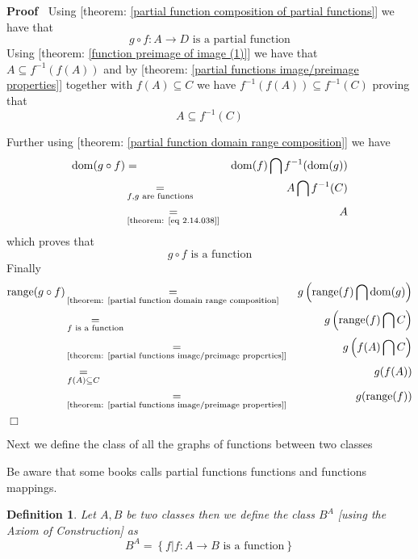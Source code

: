 \documentclass{book}
\newcommand{\equallim}{\mathop{=}\limits}
\newcommand{\tmop}[1]{\ensuremath{\operatorname{#1}}}
\newenvironment{proof}{\noindent\textbf{Proof\ }}{\hspace*{\fill}$\Box$\medskip}
\newtheorem{definition}{Definition}
{\theorembodyfont{\rmfamily}\newtheorem{example}{Example}}
\begin{document}
\begin{proof}
  Using [theorem: \ref{partial function composition of partial functions}] we
  have that
  \[ g \circ f : A \rightarrow D \text{ is a partial function} \]
  Using [theorem: \ref{function preimage of image (1)}] we have that $A
  \subseteq f^{- 1} (f (A))$ and by [theorem: \ref{partial functions
  image/preimage properties}] together with $f (A) \subseteq C$ we have $f^{-
  1} (f (A)) \subseteq f^{- 1} (C)$ proving that
  \begin{equation}
    \label{eq 2.14.038} A \subseteq f^{- 1} (C)
  \end{equation}
  
  
  Further using [theorem: \ref{partial function domain range composition}] we
  have
  \begin{eqnarray*}
    \tmop{dom} (g \circ f) & = & \tmop{dom} (f) \bigcap f^{- 1} (\tmop{dom}
    (g))\\
    & \equallim_{f, g \text{ are functions}} & A \bigcap f^{- 1} (C)\\
    & \equallim_{\text{[theorem: \ref{eq 2.14.038}]}} & A
  \end{eqnarray*}
  which proves that
  \[ g \circ f \text{ is a function} \]
  Finally
  \begin{eqnarray*}
    \tmop{range} (g \circ f) & \equallim_{\text{[theorem: \ref{partial
    function domain range composition}}} & g \left( \tmop{range} (f) \bigcap
    \tmop{dom} (g) \right)\\
    & \equallim_{f \text{ is a function}} & g \left( \tmop{range} (f) \bigcap
    C \right)\\
    & \equallim_{\text{[theorem: \ref{partial functions image/preimage
    properties}]}} & g \left( f (A) \bigcap C \right)\\
    & \equallim_{f (A) \subseteq C} & g (f (A))\\
    & \equallim_{\text{[theorem: \ref{partial functions image/preimage
    properties}]}} & g (\tmop{range} (f))
  \end{eqnarray*}
\end{proof}

Next we define the class of all the graphs of functions between two classes

\begin{note}
  Be aware that some books calls partial functions functions and functions
  mappings. 
\end{note}

\begin{definition}
  \label{function B^A}{}Let $A, B$ be two classes then we define
  the class $B^A$ [using the Axiom of Construction] as
  \[ B^A = \left\{ f|f : A \rightarrow B \text{ is a function} \right\} \]
\end{definition}
\end{document}
